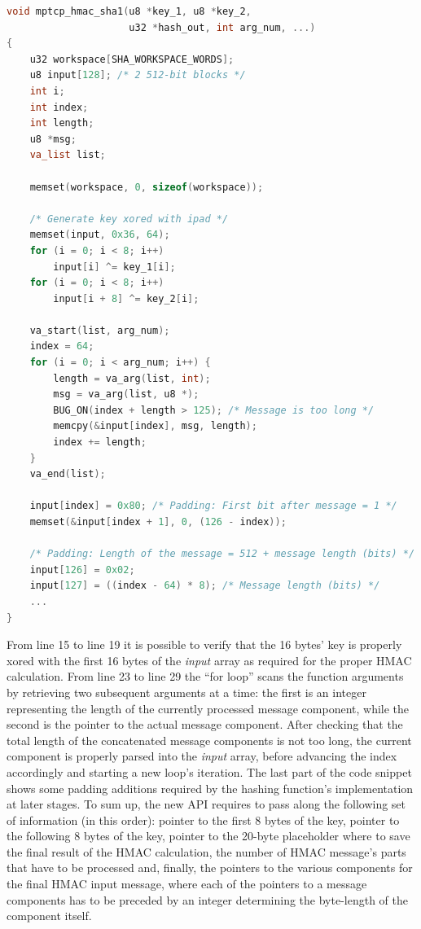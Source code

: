 \begin{lstlisting}[language=c, caption=Implementation for the new \textit{mptcp\_hmac\_sha1() function (first part)}, label=newhmac]
void mptcp_hmac_sha1(u8 *key_1, u8 *key_2,
                     u32 *hash_out, int arg_num, ...)
{
    u32 workspace[SHA_WORKSPACE_WORDS];
	u8 input[128]; /* 2 512-bit blocks */
	int i;
	int index;
	int length;
	u8 *msg;
	va_list list;

	memset(workspace, 0, sizeof(workspace));

	/* Generate key xored with ipad */
	memset(input, 0x36, 64);
	for (i = 0; i < 8; i++)
		input[i] ^= key_1[i];
	for (i = 0; i < 8; i++)
		input[i + 8] ^= key_2[i];

	va_start(list, arg_num);
	index = 64;
	for (i = 0; i < arg_num; i++) {
		length = va_arg(list, int);
		msg = va_arg(list, u8 *);
		BUG_ON(index + length > 125); /* Message is too long */
		memcpy(&input[index], msg, length);
		index += length;
	}
	va_end(list);

	input[index] = 0x80; /* Padding: First bit after message = 1 */
	memset(&input[index + 1], 0, (126 - index));

	/* Padding: Length of the message = 512 + message length (bits) */
	input[126] = 0x02;
	input[127] = ((index - 64) * 8); /* Message length (bits) */
	...
}
\end{lstlisting}

From line 15 to line 19 it is possible to verify that the 16 bytes' key is properly xored with the first 16 bytes of the \textit{input} array as required for the proper HMAC calculation. From line 23 to line 29 the ``for loop'' scans the function arguments by retrieving two subsequent arguments at a time: the first is an integer representing the length of the currently processed message component, while the second is the pointer to the actual message component. After checking that the total length of the concatenated message components is not too long, the current component is properly parsed into the \textit{input} array, before advancing the index accordingly and starting a new loop's iteration. The last part of the code snippet shows some padding additions required by the hashing function's implementation at later stages.
To sum up, the new API requires to pass along the following set of information (in this order): pointer to the first 8 bytes of the key, pointer to the following 8 bytes of the key, pointer to the 20-byte placeholder where to save the final result of the HMAC calculation, the number of HMAC message's parts that have to be processed and, finally, the pointers to the various components for the final HMAC input message, where each of the pointers to a message components has to be preceded by an integer determining the byte-length of the component itself.

